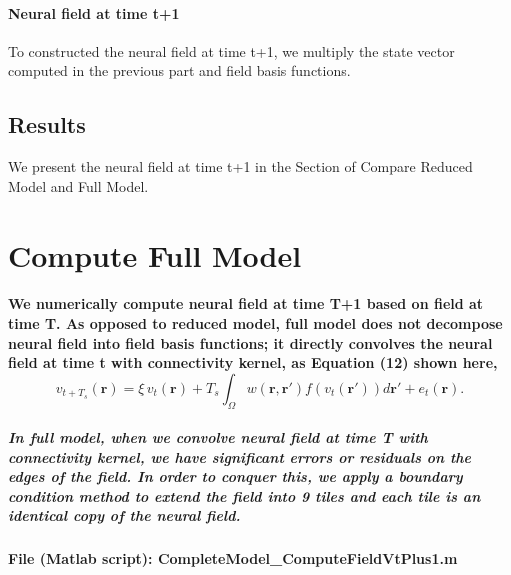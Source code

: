 \documentclass[a4paper, 12pt, english]{article}
\begin{document}
\paragraph{Neural field at time t+1\newline}
To constructed the neural field at time t+1, we multiply the state vector computed
in the previous part and field basis functions.

\subsection{Results}
We present the neural field at time t+1 in the Section of Compare Reduced Model and Full Model.

\newpage





\section{Compute Full Model}

\paragraph{We numerically compute neural field at time T+1 based on field at time T.
As opposed to reduced model, full model does not decompose neural field into field basis functions; it directly convolves
the neural field at time t with connectivity kernel, as Equation (12) shown here,
$$v_{t+T_s}(\boldsymbol{r}) = \xi\,v_t(\boldsymbol{r}) + T_s\int_{\Omega}w(\boldsymbol{r}, \boldsymbol{r\prime})f(v_t(\boldsymbol{r\prime}))d\boldsymbol{r\prime} + e_t(\boldsymbol{r}).$$}

\subparagraph{In full model, when we convolve neural field at time T with connectivity kernel,
we have significant errors or residuals on the edges of the field. In order to conquer this,
we apply a boundary condition method to extend the field into 9 tiles and each tile is an identical copy
of the neural field.}

\paragraph{File (Matlab script): CompleteModel\_ComputeFieldVtPlus1.m}
\end{document}
